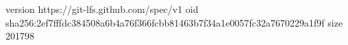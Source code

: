 version https://git-lfs.github.com/spec/v1
oid sha256:2ef7fffdc384508a6b4a76f366fcbb81463b7f34a1e0057fc32a7670229a1f9f
size 201798
